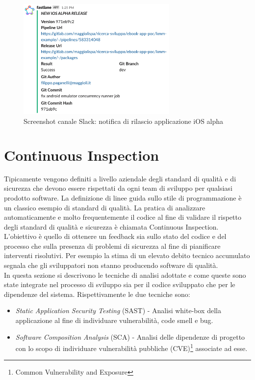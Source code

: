 \begin{figure}[H]
\centering
\includegraphics[width=0.7\textwidth]{img/Screenshot 2022-07-08 at 17.48.40.png}
\caption{Screenshot canale Slack: notifica di rilascio applicazione iOS alpha}
\end{figure}

\section{Continuous Inspection}
Tipicamente vengono definiti a livello aziendale degli standard di qualità e di sicurezza che devono essere rispettati da ogni team di sviluppo per qualsiasi prodotto software. La definizione di linee guida sullo stile di programmazione è un classico esempio di standard di qualità. La pratica di analizzare automaticamente e molto frequentemente il codice al fine di validare il rispetto degli standard di qualità e sicurezza è chiamata Continuous Inspection.
L'obiettivo è quello di ottenere un feedback sia sullo stato del codice e del processo che sulla presenza di problemi di sicurezza al fine di pianificare interventi risolutivi. Per esempio la stima di un elevato debito tecnico accumulato segnala che gli sviluppatori non stanno producendo software di qualità.\\
In questa sezione si descrivono le tecniche di analisi adottate e come queste sono state integrate nel processo di sviluppo sia per il codice sviluppato che per le dipendenze del sistema. Rispettivamente le due tecniche sono:
\begin{itemize}
    \item \textit{Static Application Security Testing} (SAST) - Analisi white-box della applicazione al fine di individuare vulnerabilità, code smell e bug.
    \item \textit{Software Composition Analysis} (SCA) - Analisi delle dipendenze di progetto con lo scopo di individuare vulnerabilità pubbliche (CVE)\footnote{Common Vulnerability and Exposure} associate ad esse.
\end{itemize}

